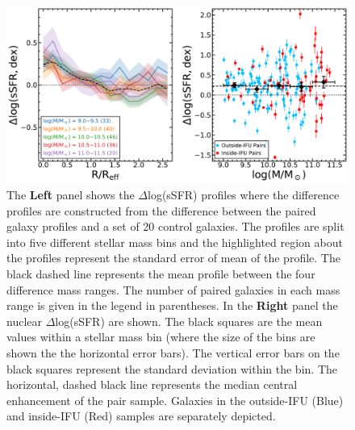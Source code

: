 \documentclass[iop,revtex4,twocolumn,apj,numberedappendix,appendixfloats]{emulateapj}
\begin{document}
\begin{figure}
\centering
\includegraphics[width=\linewidth]{fig/ssfr_mass.pdf}
\caption[]{The \textbf{Left} panel shows the $\Delta$log(sSFR) profiles where the difference profiles are constructed from the difference between the paired galaxy profiles and a set of 20 control galaxies. The profiles are split into five different stellar mass bins and the highlighted region about the profiles represent the standard error of mean of the profile. The black dashed line represents the mean profile between the four difference mass ranges. The number of paired galaxies in each mass range is given in the legend in parentheses. In the \textbf{Right} panel the nuclear $\Delta$log(sSFR) are shown. The black squares are the mean values within a stellar mass bin (where the size of the bins are shown the the horizontal error bars). The vertical error bars on the black squares represent the standard deviation within the bin. The horizontal, dashed black line represents the median central enhancement of the pair sample. Galaxies in the outside-IFU (Blue) and inside-IFU (Red) samples are separately depicted.}
\label{fig:ssfr_mass}
\end{figure}
\end{document}
